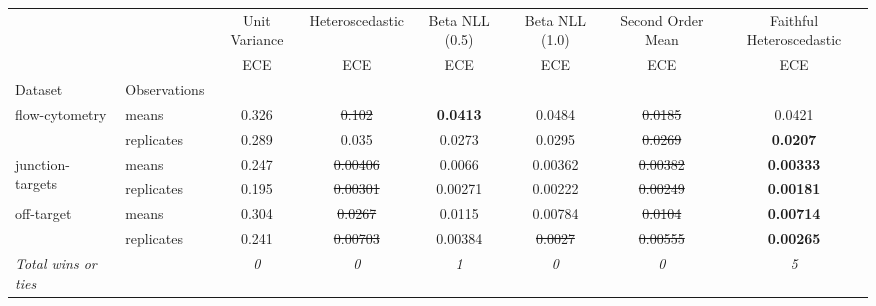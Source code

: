 \begin{tabular}{ll|c|c|c|c|c|c}
\toprule
{} & {} & {Unit Variance} & {Heteroscedastic} & {Beta NLL (0.5)} & {Beta NLL (1.0)} & {Second Order Mean} & {Faithful Heteroscedastic} \\
{} & {} & {ECE} & {ECE} & {ECE} & {ECE} & {ECE} & {ECE} \\
{Dataset} & {Observations} & {} & {} & {} & {} & {} & {} \\
\midrule
\multirow[t]{2}{*}{flow-cytometry} & means & 0.326 & \sout{0.102} & \textbf{0.0413} & 0.0484 & \sout{0.0185} & 0.0421 \\
 & replicates & 0.289 & 0.035 & 0.0273 & 0.0295 & \sout{0.0269} & \textbf{0.0207} \\
\multirow[t]{2}{*}{junction-targets} & means & 0.247 & \sout{0.00406} & 0.0066 & 0.00362 & \sout{0.00382} & \textbf{0.00333} \\
 & replicates & 0.195 & \sout{0.00301} & 0.00271 & 0.00222 & \sout{0.00249} & \textbf{0.00181} \\
\multirow[t]{2}{*}{off-target} & means & 0.304 & \sout{0.0267} & 0.0115 & 0.00784 & \sout{0.0104} & \textbf{0.00714} \\
 & replicates & 0.241 & \sout{0.00703} & 0.00384 & \sout{0.0027} & \sout{0.00555} & \textbf{0.00265} \\
\textit{{Total wins or ties}} &  & \textit{0} & \textit{0} & \textit{1} & \textit{0} & \textit{0} & \textit{5} \\
\bottomrule
\end{tabular}
